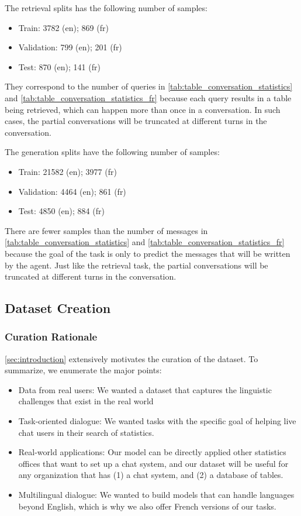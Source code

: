 \documentclass[11pt]{article}
\begin{document}
The retrieval splits has the following number of samples:
\begin{itemize}
    \item Train: 3782 (en); 869 (fr)
    \item Validation: 799 (en); 201 (fr)
    \item Test: 870 (en); 141 (fr)
\end{itemize}

They correspond to the number of queries in \autoref{tab:table_conversation_statistics} and \autoref{tab:table_conversation_statistics_fr} because each query results in a table being retrieved, which can happen more than once in a conversation. In such cases, the partial conversations will be truncated at different turns in the conversation.

The generation splits have the following number of samples:
\begin{itemize}
    \item Train: 21582 (en); 3977 (fr)
    \item Validation: 4464 (en); 861 (fr)
    \item Test: 4850 (en); 884 (fr)
\end{itemize}

There are fewer samples than the number of messages in  \autoref{tab:table_conversation_statistics} and \autoref{tab:table_conversation_statistics_fr} because the goal of the task is only to predict the messages that will be written by the agent. Just like the retrieval task, the partial conversations will be truncated at different turns in the conversation.

\subsection{Dataset Creation}

\subsubsection{Curation Rationale}

\autoref{sec:introduction} extensively motivates the curation of the dataset. To summarize, we enumerate the major points:

\begin{itemize}
    \item Data from real users: We wanted a dataset that captures the linguistic challenges that exist in the real world
    \item Task-oriented dialogue: We wanted tasks with the specific goal of helping live chat users in their search of statistics.
    \item Real-world applications: Our model can be directly applied other statistics offices that want to set up a chat system, and our dataset will be useful for any organization that has (1) a chat system, and (2) a database of tables.
    \item Multilingual dialogue: We wanted to build models that can handle languages beyond English, which is why we also offer French versions of our tasks.
\end{itemize}
\end{document}
